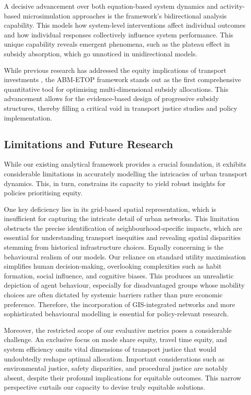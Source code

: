 \documentclass[a4paper,fleqn]{cas-sc}
\begin{document}
A decisive advancement over both equation-based system dynamics and activity-based microsimulation approaches is the framework's bidirectional analysis capability. This models how system-level interventions affect individual outcomes and how individual responses collectively influence system performance. This unique capability reveals emergent phenomena, such as the plateau effect in subsidy absorption, which go unnoticed in unidirectional models.

While previous research has addressed the equity implications of transport investments \citep{Pereira2017, Karner2020}, the ABM-ETOP framework stands out as the first comprehensive quantitative tool for optimising multi-dimensional subsidy allocations. This advancement allows for the evidence-based design of progressive subsidy structures, thereby filling a critical void in transport justice studies and policy implementation.

\subsection{Limitations and Future Research}
While our existing analytical framework provides a crucial foundation, it exhibits considerable limitations in accurately modelling the intricacies of urban transport dynamics. This, in turn, constrains its capacity to yield robust insights for policies prioritising equity.

One key deficiency lies in its grid-based spatial representation, which is insufficient for capturing the intricate detail of urban networks. This limitation obstructs the precise identification of neighbourhood-specific impacts, which are essential for understanding transport inequities and revealing spatial disparities stemming from historical infrastructure choices. Equally concerning is the behavioural realism of our models. Our reliance on standard utility maximisation simplifies human decision-making, overlooking complexities such as habit formation, social influence, and cognitive biases. This produces an unrealistic depiction of agent behaviour, especially for disadvantaged groups whose mobility choices are often dictated by systemic barriers rather than pure economic preference. Therefore, the incorporation of GIS-integrated networks and more sophisticated behavioural modelling is essential for policy-relevant research.

Moreover, the restricted scope of our evaluative metrics poses a considerable challenge. An exclusive focus on mode share equity, travel time equity, and system efficiency omits vital dimensions of transport justice that would undoubtedly reshape optimal allocation. Important considerations such as environmental justice, safety disparities, and procedural justice are notably absent, despite their profound implications for equitable outcomes. This narrow perspective curtails our capacity to devise truly equitable solutions.
\end{document}
